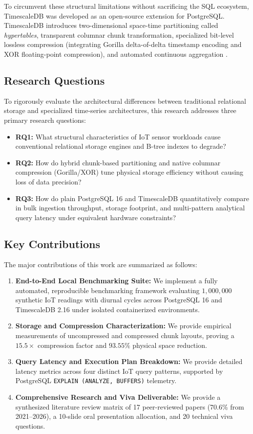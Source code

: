 \documentclass[conference,a4paper]{IEEEtran}
\begin{document}
To circumvent these structural limitations without sacrificing the SQL ecosystem, TimescaleDB was developed as an open-source extension for PostgreSQL. TimescaleDB introduces two-dimensional space-time partitioning called \textit{hypertables}, transparent columnar chunk transformation, specialized bit-level lossless compression (integrating Gorilla delta-of-delta timestamp encoding and XOR floating-point compression), and automated continuous aggregation \cite{freedman2017timescaledb, liu2024comprehensive}.

\subsection{Research Questions}
To rigorously evaluate the architectural differences between traditional relational storage and specialized time-series architectures, this research addresses three primary research questions:
\begin{itemize}
    \item \textbf{RQ1:} What structural characteristics of IoT sensor workloads cause conventional relational storage engines and B-tree indexes to degrade?
    \item \textbf{RQ2:} How do hybrid chunk-based partitioning and native columnar compression (Gorilla/XOR) tune physical storage efficiency without causing loss of data precision?
    \item \textbf{RQ3:} How do plain PostgreSQL 16 and TimescaleDB quantitatively compare in bulk ingestion throughput, storage footprint, and multi-pattern analytical query latency under equivalent hardware constraints?
\end{itemize}

\subsection{Key Contributions}
The major contributions of this work are summarized as follows:
\begin{enumerate}
    \item \textbf{End-to-End Local Benchmarking Suite:} We implement a fully automated, reproducible benchmarking framework evaluating $1,000,000$ synthetic IoT readings with diurnal cycles across PostgreSQL 16 and TimescaleDB 2.16 under isolated containerized environments.
    \item \textbf{Storage and Compression Characterization:} We provide empirical measurements of uncompressed and compressed chunk layouts, proving a $15.5\times$ compression factor and $93.55\%$ physical space reduction.
    \item \textbf{Query Latency and Execution Plan Breakdown:} We provide detailed latency metrics across four distinct IoT query patterns, supported by PostgreSQL \texttt{EXPLAIN (ANALYZE, BUFFERS)} telemetry.
    \item \textbf{Comprehensive Research and Viva Deliverable:} We provide a synthesized literature review matrix of 17 peer-reviewed papers (70.6\% from 2021--2026), a 10-slide oral presentation allocation, and 20 technical viva questions.
\end{enumerate}
\end{document}
